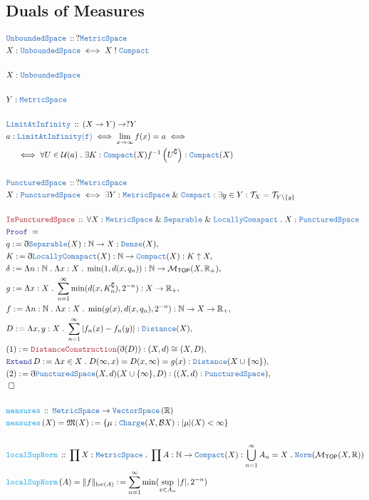 \documentclass[12pt]{scrartcl}
\newcommand{\TYPE}[1]{\textcolor{NavyBlue}{\mathtt{#1}}}
\newcommand{\FUNC}[1]{\textcolor{Cerulean}{\mathtt{#1}}}
\newcommand{\LOGIC}[1]{\textcolor{Blue}{\mathtt{#1}}}
\newcommand{\THM}[1]{\textcolor{Maroon}{\mathtt{#1}}}
\renewcommand{\.}{\; . \;}
\newcommand{\de}{: \kern 0.1pc =}
\newcommand{\IsNot}{\; ! \;}
\newcommand{\Act}[1]{\left( #1 \right)}
\newcommand{\Theorem}[2]{& \THM{#1} \, :: \, #2 \\ & \Proof = \\ }
\newcommand{\DeclareType}[2]{& \TYPE{#1} \, :: \, #2 \\}
\newcommand{\DefineType}[3]{& #1 : \TYPE{#2} \iff #3 \\}
\newcommand{\DefineNamedType}[4]{& #1 : \TYPE{#2} \iff #3 \iff #4 \\}
\newcommand{\DeclareFunc}[2]{& \FUNC{#1} \, :: \, #2 \\}
\newcommand{\DefineNamedFunc}[4]{&  \FUNC{#1}\Act{#2} = #3 \de #4 \\}
\newcommand{\NewLine}{\\ & \kern 1pc}
\renewcommand{\And}{\; \& \;}
\newcommand{\Reals}{\mathbb{R} }
\newcommand{\Nat}{\mathbb{N} }
\renewcommand{\c}{\complement}
\newcommand{\Say}[3]{& #1 \de #2 : #3, \\}
\newcommand{\QED}{\; \square}
\newcommand{\EndProof}{& \QED \\}
\newcommand{\ByDef}{\eth}
\newcommand{\Proof}{\LOGIC{Proof} \; }
\newcommand{\Mor}{\mathcal{M}}
\newcommand{\VS}[1]{\TYPE{VectorSpace}\left( #1 \right)}
\newcommand{\MS}{\TYPE{MetricSpace}}
\newcommand{\Sep}{\TYPE{Separable}}
\newcommand{\LC}{\TYPE{LocallyComapact}}
\newcommand{\Compact}{\TYPE{Compact}}
\newcommand{\Dense}{\TYPE{Dense}}
\newcommand{\B}{\mathcal{B}}
\begin{document}
\subsection{Duals of Measures}
\begin{align*}
\DeclareType{ \TYPE{UnboundedSpace} }{?\TYPE{MetricSpace} }
\DefineType{ X }{ \TYPE{UnboundedSpace} }{ X \IsNot \TYPE{Compact}  }
\\
& X : \TYPE{UnboundedSpace} \\
\\
& Y : \TYPE{MetricSpace} \\
\\
\DeclareType{ LimitAtInfinity }{ ( X \to Y )  \to ?Y}
\DefineNamedType{a}{ \TYPE{ LimitAtInfinity  }(f) }{ \lim_{x \to \infty} f(x) = a }{ \NewLine \iff  \forall U \in \mathcal{U}(a) 
  \. \exists K : \Compact(X)
f^{-1} \left( U^\c  \right) : \TYPE{Compact}(X)  }
\\
\DeclareType{ PuncturedSpace  }{ ?\TYPE{MetricSpace}  }
\DefineType{ X  }{ PuncturedSpace }{ \exists Y : \TYPE{MetricSpace} \And \TYPE{Compact} : \exists y \in Y : \mathcal{T}_X  = \mathcal{T}_{Y \setminus \{y \} } }
\\
\Theorem{ IsPuncturedSpace  }{ \forall X : \MS \And \Sep \And \LC \. X : \TYPE{PuncturedSpace}  }
\Say{ q }{\ByDef \Sep (X)}{ \Nat \to X : \Dense(X)  }
\Say{ K  }{ \ByDef \LC (X)  }{ \Nat \to \TYPE{Compact}(X) : K \uparrow X }
\Say{ \delta }{ \Lambda n : \Nat \. \Lambda x : X \. \min(1, d(x,q_n)) }{ \Nat \to \Mor_{\mathsf{TOP}}( X, \Reals_+ )}
\Say{ g }{  \Lambda x : X \. \sum^\infty_{n = 1} \min( d(x, K_n^\c ), 2^{-n}  )  }{  X  \to \Reals_+  }
\Say{ f  }{ \Lambda n : \Nat \. \Lambda x : X \.  \min( g(x), d(x,q_n), 2^{-n} ) }{ \Nat \to X \to \Reals_+  }
\Say{ D  }{ \Lambda x,y: X \. \sum^\infty_{n = 1} | f_n(x) - f_n(y)    |  }{  \TYPE{Distance}(X)  }
\Say{ (1) }{ \THM{DistanceConstruction}(\ByDef(D) )       }{ (X,d) \cong (X,D)  }
\Say{ \LOGIC{Extend} \, D  }{  \Lambda x \in X \.  D(\infty,x) = D(x,\infty) = g(x)  }{ \TYPE{Distance}(X \cup \{  \infty  \} ) }
\Say{(2)}{ \ByDef \TYPE{PuncturedSpace}(X, d)(X \cup \{ \infty \}, D   )  }{  ((X,d)  : \TYPE{PuncturedSpace} )       }
\EndProof
\\
\DeclareFunc{ measures  }{ \MS \to \VS{\Reals}   }
\DefineNamedFunc{ measures  }{ X  }{ \mathfrak{ M }(X) }{ \{ \mu : \TYPE{Charge}(X, \B X) : |\mu|(X) < \infty   \}   }
\\
\DeclareFunc{ localSupNorm  }{ \prod X : \MS \.  \prod A : \Nat \to \TYPE{Compact}( X ) : \bigcup^\infty_{n = 1} A_n =  X \. \TYPE{Norm}(\Mor_{\mathsf{TOP}}(X, \Reals))   }
\DefineNamedFunc{ localSupNorm  }{A}{ \| f  \|_{\mathrm{loc}(A)} }{ \sum^\infty_{n = 1}  \min(  \sup_{x \in  A_n}|f | , 2^{-n} )  }
\end{align*}
\end{document}
